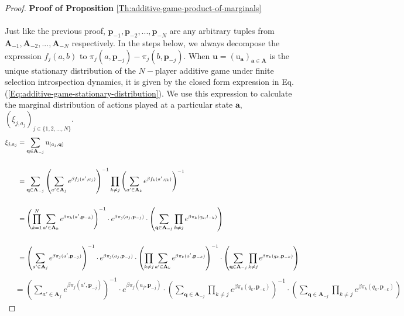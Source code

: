 \documentclass[11pt]{article}
\theoremstyle{plainCl1}
\theoremstyle{plainCl2}
\newcommand{\A}{\mathbf{A}}
\newcommand{\abf}{\mathbf{a}}
\newcommand{\qbf}{\mathbf{q}}
\newcommand{\pbf}{\mathbf{p}}
\newcommand{\ubf}{\mathbf{u}}
\begin{document}
\begin{proof}
\textbf{Proof of Proposition} \ref{Th:additive-game-product-of-marginals} \\ \\ 
Just like the previous proof, $\pbf_{-1}, \pbf_{-2},...,\pbf_{-N} $ are any arbitrary tuples from $\A_{-1}, \A_{-2},...,\A_{-N}$ respectively. In the steps below, we always decompose the expression $f_j(a,b)$ to $\pi_j(a,\pbf_{-j}) - \pi_j(b,\pbf_{-j})$. When $\ubf = (\mathrm{u}_\abf)_{\abf \in \A}$ is the unique stationary distribution of the $N-$player additive game under finite selection introspection dynamics, it is given by the closed form expression in Eq. (\ref{Eq:additive-game-stationary-distribution}). We use this expression to calculate the marginal distribution of actions played at a particular state $\abf$, $(\xi_{j,a_j})_{j \in \{1,2,...,N\}}$. 
\begin{align}
\xi_{j,a_j} &= \sum_{\qbf \in \A_{-j}} \mathrm{u}_{(a_j,\qbf)} \\ \notag \\
&= \sum_{\qbf \in \A_{-j}} \left( \sum_{a' \in \A_j} \displaystyle e^{\beta f_j(a',a_j)}\right)^{-1} \prod_{k \neq j} \left( \sum_{a' \in \A_k} \displaystyle e^{\beta f_k(a',q_k)}\right)^{-1} \\ \notag \\
&= \left( \prod_{k=1}^N \sum_{a' \in \A_k} \displaystyle e^{\beta \pi_k (a', \pbf_{-k})}\right)^{-1} \cdot \displaystyle e^{\beta \pi_j(a_j, \pbf_{-j})} \cdot \left( \sum_{\qbf \in \A_{-j}} \prod_{k \neq j} e^{\beta \pi_k(q_k, l_{-k})} \right) \\ \notag \\
\label{step-prod-sum}
&= \left( \sum_{a' \in \A_j} \displaystyle e^{\beta \pi_j(a',\pbf_{-j})}\right)^{-1} \cdot \displaystyle e^{\beta \pi_j(a_j, \pbf_{-j})}\cdot \left( \prod_{k\neq j} \sum_{a' \in \A_k} \displaystyle e^{\beta \pi_k(a',\pbf_{-k})}\right)^{-1} \cdot \left( \sum_{\qbf \in \A_{-j}} \prod_{k \neq j} e^{\beta \pi_k(q_k,\pbf_{-k})} \right)
\end{align}
\newpage
\begin{align}
\label{step-sum-prod}
&= \left( \sum_{a' \in \A_j} \displaystyle e^{\beta \pi_j(a',\pbf_{-j})}\right)^{-1} \cdot \displaystyle e^{\beta \pi_j(a_j, \pbf_{-j})}\cdot \left( \sum_{\qbf \in \A_{-j}} \prod_{k\neq j}  \displaystyle e^{\beta \pi_k(q_k,\pbf_{-k})} \right)^{-1} \cdot \left( \sum_{\qbf \in \A_{-j}} \prod_{k \neq j} e^{\beta \pi_k(q_k,\pbf_{-k})}  \right)
\end{align}

\end{proof}
\end{document}
